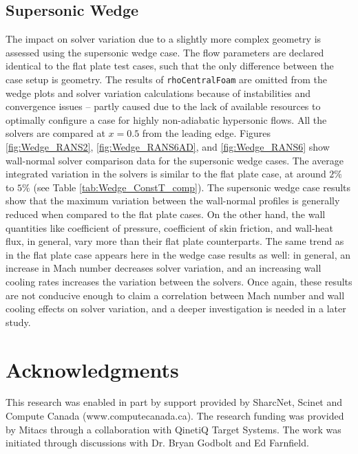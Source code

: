 \documentclass[journal ]{new-aiaa}
\begin{document}
\subsection{Supersonic Wedge}
The impact on solver variation due to a slightly more complex geometry is assessed using the supersonic wedge case. The flow parameters are declared identical to the flat plate test cases, such that the only difference between the case setup is geometry. The results of \texttt{rhoCentralFoam} are omitted from the wedge plots and solver variation calculations because of instabilities and convergence issues -- partly caused due to the lack of available resources to optimally configure a case for highly non-adiabatic hypersonic flows. All the solvers are compared at $x=0.5$ from the leading edge. Figures \ref{fig:Wedge_RANS2}, \ref{fig:Wedge_RANS6AD}, and \ref{fig:Wedge_RANS6} show wall-normal solver comparison data for the supersonic wedge cases. The average integrated variation in the solvers is similar to the flat plate case, at around $2\%$ to $5\%$ (see Table \ref{tab:Wedge_ConstT_comp}). The supersonic wedge case results show that the maximum variation between the wall-normal profiles is generally reduced when compared to the flat plate cases. On the other hand, the wall quantities like coefficient of pressure, coefficient of skin friction, and wall-heat flux, in general, vary more than their flat plate counterparts. The same trend as in the flat plate case appears here in the wedge case results as well: in general, an increase in Mach number decreases solver variation, and an increasing wall cooling rates increases the variation between the solvers. Once again, these results are not conducive enough to claim a correlation between Mach number and wall cooling effects on solver variation, and a deeper investigation is needed in a later study. 


\section*{Acknowledgments}
This research was enabled in part by support provided by SharcNet, Scinet and Compute Canada (www.computecanada.ca). The research funding was provided by Mitacs through a collaboration with QinetiQ Target Systems. The work was initiated through discussions with Dr. Bryan Godbolt and Ed Farnfield.


\clearpage
\end{document}
